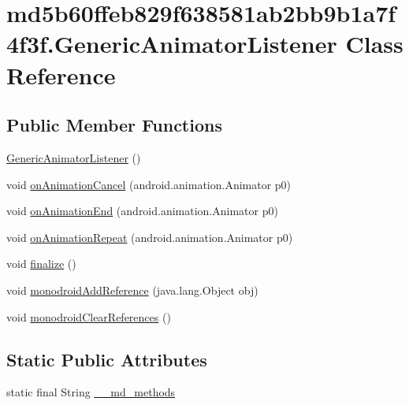 \hypertarget{classmd5b60ffeb829f638581ab2bb9b1a7f4f3f_1_1_generic_animator_listener}{
\section{md5b60ffeb829f638581ab2bb9b1a7f4f3f.GenericAnimatorListener Class Reference}
\label{classmd5b60ffeb829f638581ab2bb9b1a7f4f3f_1_1_generic_animator_listener}
}
\subsection*{Public Member Functions}
\begin{CompactItemize}
\item 
\hyperlink{classmd5b60ffeb829f638581ab2bb9b1a7f4f3f_1_1_generic_animator_listener_8f257c09a32e6e745585c451a08a2659}{GenericAnimatorListener} ()
\item 
void \hyperlink{classmd5b60ffeb829f638581ab2bb9b1a7f4f3f_1_1_generic_animator_listener_b745db9d1bbb0cb04441a727772e9cf0}{onAnimationCancel} (android.animation.Animator p0)
\item 
void \hyperlink{classmd5b60ffeb829f638581ab2bb9b1a7f4f3f_1_1_generic_animator_listener_ce339af29a5453d7f7cc1f5dcefd6248}{onAnimationEnd} (android.animation.Animator p0)
\item 
void \hyperlink{classmd5b60ffeb829f638581ab2bb9b1a7f4f3f_1_1_generic_animator_listener_e1933b559083185b38a40651ea936d48}{onAnimationRepeat} (android.animation.Animator p0)
\item 
void \hyperlink{classmd5b60ffeb829f638581ab2bb9b1a7f4f3f_1_1_generic_animator_listener_5498cbcf56e1098c0a13447afde9ae4a}{finalize} ()
\item 
void \hyperlink{classmd5b60ffeb829f638581ab2bb9b1a7f4f3f_1_1_generic_animator_listener_613f7bd903d31fdcf64c5b8fff2e0ad4}{monodroidAddReference} (java.lang.Object obj)
\item 
void \hyperlink{classmd5b60ffeb829f638581ab2bb9b1a7f4f3f_1_1_generic_animator_listener_876788d7a8833b3f98d2609c2b63e16d}{monodroidClearReferences} ()
\end{CompactItemize}
\subsection*{Static Public Attributes}
\begin{CompactItemize}
\item 
static final String \hyperlink{classmd5b60ffeb829f638581ab2bb9b1a7f4f3f_1_1_generic_animator_listener_2cc0ec65c1c849bc5bff6baeb2599d15}{\_\-\_\-md\_\-methods}
\end{CompactItemize}
